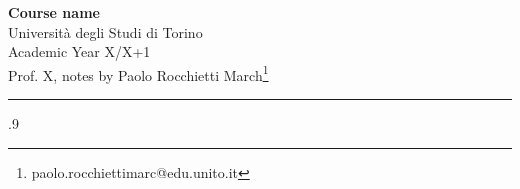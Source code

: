 \documentclass[a4paper,11pt]{article}
\begin{document}
\begin{center}
\Large{\textbf{Course name}}
\vspace{0.4cm}
\normalsize
\\ Università degli Studi di Torino\\Academic Year X/X+1 \\Prof. X,
notes by Paolo Rocchietti March\footnote{paolo.rocchiettimarc@edu.unito.it} \\

\vspace{0.1cm}
\medskip
\normalsize
\end{center}
\vspace{0.4cm}
{\color{gray}\hrule}
\null\vfill
\vfill\null
\newpage
\begin{spacing}{.9}
\tableofcontents
\end{spacing}
\newpage
\pagestyle{fancy}
\thispagestyle{fancy}
\fancyfoot[C]{\small{\thepage}}

\end{document}
